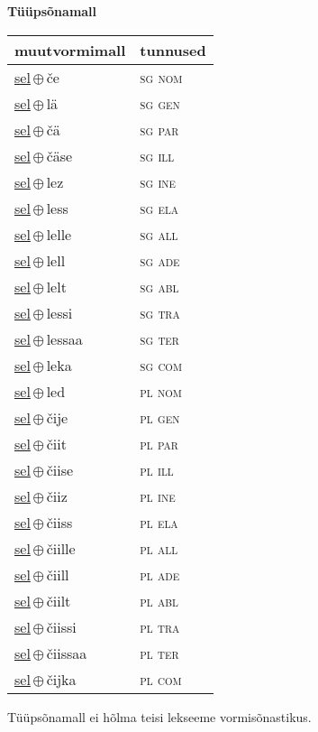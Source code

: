 

\vspace{3.5em}
\noindent \begin{minipage}{\textwidth}
\noindent \textbf{Tüüpsõnamall \,}\\

\begin{sideways}
\begin{tabular}{l l}
muutvormimall & tunnused \\
\hline
\underline{sel}\,$\oplus$\,če & \textsc{ sg nom } \\
\underline{sel}\,$\oplus$\,lä & \textsc{ sg gen } \\
\underline{sel}\,$\oplus$\,čä & \textsc{ sg par } \\
\underline{sel}\,$\oplus$\,čäse & \textsc{ sg ill } \\
\underline{sel}\,$\oplus$\,lez & \textsc{ sg ine } \\
\underline{sel}\,$\oplus$\,less & \textsc{ sg ela } \\
\underline{sel}\,$\oplus$\,lelle & \textsc{ sg all } \\
\underline{sel}\,$\oplus$\,lell & \textsc{ sg ade } \\
\underline{sel}\,$\oplus$\,lelt & \textsc{ sg abl } \\
\underline{sel}\,$\oplus$\,lessi & \textsc{ sg tra } \\
\underline{sel}\,$\oplus$\,lessaa & \textsc{ sg ter } \\
\underline{sel}\,$\oplus$\,leka & \textsc{ sg com } \\
\underline{sel}\,$\oplus$\,led & \textsc{ pl nom } \\
\underline{sel}\,$\oplus$\,čije & \textsc{ pl gen } \\
\underline{sel}\,$\oplus$\,čiit & \textsc{ pl par } \\
\underline{sel}\,$\oplus$\,čiise & \textsc{ pl ill } \\
\underline{sel}\,$\oplus$\,čiiz & \textsc{ pl ine } \\
\underline{sel}\,$\oplus$\,čiiss & \textsc{ pl ela } \\
\underline{sel}\,$\oplus$\,čiille & \textsc{ pl all } \\
\underline{sel}\,$\oplus$\,čiill & \textsc{ pl ade } \\
\underline{sel}\,$\oplus$\,čiilt & \textsc{ pl abl } \\
\underline{sel}\,$\oplus$\,čiissi & \textsc{ pl tra } \\
\underline{sel}\,$\oplus$\,čiissaa & \textsc{ pl ter } \\
\underline{sel}\,$\oplus$\,čijka & \textsc{ pl com } \\
\end{tabular}
\end{sideways}
\label{tab:tüüpsõnamall-selče}

\end{minipage}

 
\vspace{1em}
\noindent Tüüpsõnamall  ei hõlma teisi lekseeme vormi\-sõnastikus.
